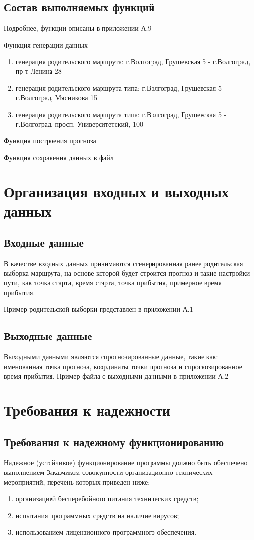 \documentclass[a4paper,english]{G2-105}
\begin{document}
		\subsection{Состав выполняемых функций}
			\par Подробнее, функции описаны в приложении А.9
			\par Функция генерации данных
				\begin{enumerate}
					\item генерация родительского маршрута: г.Волгоград, Грушевская 5 - г.Волгоград, пр-т Ленина 28
					\item генерация родительского маршрута типа: г.Волгоград, Грушевская 5 - г.Волгоград, Мясникова 15
					\item генерация родительского маршрута типа: г.Волгоград, Грушевская 5 - г.Волгоград, просп. Университетский, 100
				\end {enumerate}
			\par Функция построения прогноза
			\par Функция сохранения данных в файл
	\section{Организация входных и выходных данных}
		\subsection{Входные данные}
			\par В качестве входных данных принимаются сгенерированная ранее родительская выборка маршрута, на основе которой будет строится прогноз и такие настройки пути, как точка старта, время старта, точка прибытия, примерное время прибытия. 
			\par Пример родительской выборки представлен в приложении А.1
		\subsection{Выходные данные}
			\par Выходными данными являются спрогнозированные данные, такие как: именованная точка прогноза, координаты точки прогноза и спрогнозированное время прибытия. Пример файла с выходными данными в приложении А.2
	\section{Требования к надежности}
		\subsection{Требования к надежному функционированию}
			\par Надежное (устойчивое) функционирование  программы должно быть обеспечено выполнением Заказчиком совокупности организационно-технических мероприятий, перечень которых приведен ниже:
			\begin{enumerate}
				\item организацией бесперебойного питания технических средств;
				\item испытания программных средств на наличие вирусов;
				\item использованием лицензионного программного обеспечения.
			\end {enumerate}
\end{document}
